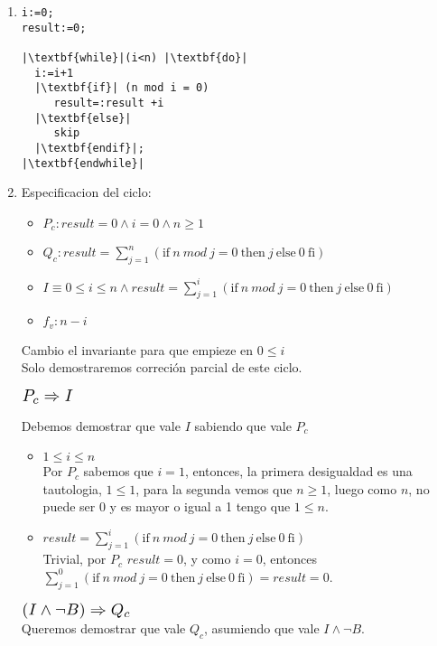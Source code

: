 \documentclass{article}
\begin{document}
\noindent
\begin{enumerate}[label=\alph*)]
	\item 

\begin{lstlisting}
i:=0;
result:=0;

|\textbf{while}|(i<n) |\textbf{do}|
  i:=i+1
  |\textbf{if}| (n mod i = 0) 
     result=:result +i
  |\textbf{else}|
     skip
  |\textbf{endif}|;
|\textbf{endwhile}|
\end{lstlisting}
	\item
	
 Especificacion del ciclo:
	\begin{itemize}
		\item $P_c: result=0 \wedge i=0\wedge n\geq 1$
		\item $Q_c:result=\sum_{j=1}^{n}(\textrm{if}\ n\ mod\ j=0\ \textrm{then}\ j\ \textrm{else}\ 0\ \textrm{fi})$
		\item $I\equiv 0\leq i\leq n \wedge result=\sum_{j=1}^{i}(\textrm{if}\ n\ mod\ j=0\ \textrm{then}\ j\ \textrm{else}\ 0\ \textrm{fi})$
		\item $f_v:n-i$
	\end{itemize}
	Cambio el invariante para que empieze en $0\leq i$\\
	Solo demostraremos correción parcial de este ciclo.
	\begin{flushleft}$\scalebox{1.3}{$P_c\Rightarrow I$}$\end{flushleft}
	Debemos demostrar que vale $I$ sabiendo que vale $P_c$ 
	\begin{itemize}
		\item $ 1\leq i\leq n$\smallskip \\
		Por $P_c$ sabemos que $i=1$, entonces, la primera desigualdad es una tautologia,
		$1\leq 1$, para la segunda vemos que $n\geq 1$, luego como 
		$n$, no puede ser 0 y es mayor o igual a 1 tengo que $1\leq n$.
		\item  $result=\sum_{j=1}^{i}(\textrm{if}\ n\ mod\ j=0\ \textrm{then}\ j\ \textrm{else}\ 0\ \textrm{fi})$\\
		Trivial, por $P_c$ $result=0$, y  como $i=0$, entonces
		 $\sum_{j=1}^{0}(\textrm{if}\ n\ mod\ j=0\ \textrm{then}\ j\ \textrm{else}\ 0\ \textrm{fi})=result=0$.
	\end{itemize}	 
	$\scalebox{1.3}{$(I\wedge \neg B)\Rightarrow Q_c$}$\smallskip \\
	Queremos demostrar que vale $Q_c$, asumiendo que vale  $I\wedge \neg B$.
	\begin{itemize}

\end{itemize}
\end{enumerate}
\end{document}
